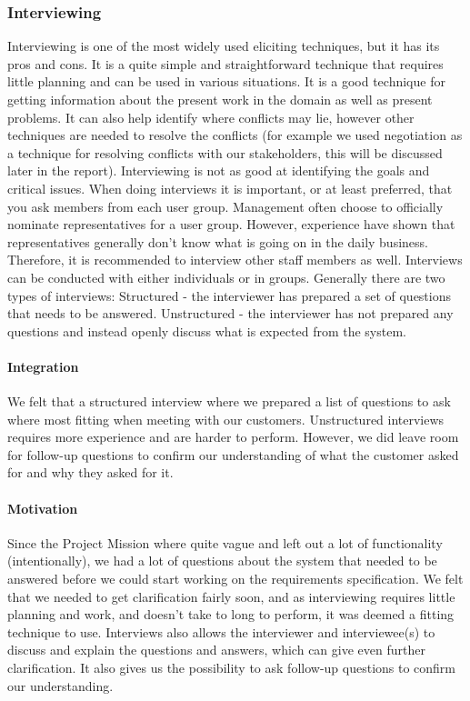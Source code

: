 \documentclass[10pt]{article}
\begin{document}
\subsubsection{Interviewing}
Interviewing is one of the most widely used eliciting techniques, but it has its pros and cons. It is a quite simple and straightforward technique that requires little planning and can be used in various situations. It is a good technique for getting information about the present work in the domain as well as present problems. It can also help identify where conflicts may lie, however other techniques are needed to resolve the conflicts (for example we used negotiation as a technique for resolving conflicts with our stakeholders, this will be discussed later in the report). Interviewing is not as good at identifying the goals and critical issues.
When doing interviews it is important, or at least preferred, that you ask members from each user group. Management often choose to officially nominate representatives for a user group. However, experience have shown that representatives generally don’t know what is going on in the daily business. Therefore, it is recommended to interview other staff members as well. Interviews can be conducted with either individuals or in groups.
Generally there are two types of interviews: 
Structured -  the interviewer has prepared a set of questions that needs to be answered. 
Unstructured - the interviewer has not prepared any questions and instead openly discuss what is expected from the system. 
\paragraph{Integration}
We felt that a structured interview where we prepared a list of questions to ask where most fitting when meeting with our customers. Unstructured interviews requires more experience and are harder to perform. However, we did leave room for follow-up questions to confirm our understanding of what the customer asked for and why they asked for it. 
\paragraph{Motivation}
Since the Project Mission where quite vague and left out a lot of functionality (intentionally), we had a lot of questions about the system that needed to be answered before we could start working on the requirements specification. We felt that we needed to get clarification fairly soon, and as interviewing requires little planning and work, and doesn’t take to long to perform, it was deemed a fitting technique to use. Interviews also allows the interviewer and interviewee(s) to discuss and explain the questions and answers, which can give even further clarification. It also gives us the possibility to ask follow-up questions to confirm our understanding. 
\end{document}
